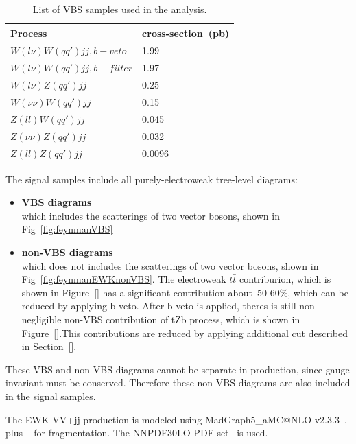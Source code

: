 \begin{table}[!htbp]
\begin{center}
\small
\begin{tabular}{|l|l|}
\hline
Process & cross-section~(pb) \\
\hline
$W(l\nu)W(qq\prime)jj,b-veto$     & 1.99    \\
$W(l\nu)W(qq\prime)jj,b-filter$   &  1.97   \\
$W(l\nu)Z(qq\prime)jj$            &  0.25   \\
$W(\nu\nu)W(qq\prime)jj$          &  0.15   \\
$Z(ll)W(qq\prime)jj$              &  0.045  \\
$Z(\nu\nu)Z(qq\prime)jj$          &  0.032  \\
$Z(ll)Z(qq\prime)jj$              &  0.0096 \\
\hline
\end{tabular}
\caption{List of VBS samples used in the analysis.
}
\label{tab:VBS_sig_samples}
\end{center}
\end{table}

The signal samples include all purely-electroweak tree-level diagrams:
\begin{itemize}
    \item \textbf{VBS diagrams} 
    \\ which includes the scatterings of two vector bosons, shown in Fig~\ref{fig:feynmanVBS}
    \item \textbf{non-VBS diagrams} 
    \\ which does not includes the scatterings of two vector bosons, shown in Fig~\ref{fig:feynmanEWKnonVBS}. The electroweak $t\bar{t}$ contriburion, which is shown in Figure~\ref{} has a significant contribution about~50-60\%, which can be reduced by applying b-veto. After b-veto is applied, theres is still non-negligible non-VBS contribution of tZb process, which is shown in Figure~\ref{}.This contributions are reduced by applying additional cut described in Section~\ref{}.
\end{itemize}

These VBS and non-VBS diagrams cannot be separate in production, since gauge invariant must be conserved. Therefore these non-VBS diagrams are also included in the signal samples.

The EWK VV+jj production is modeled using MadGraph5\_aMC@NLO v2.3.3~\cite{Alwall:2014hca},
plus ~\cite{Sjostrand:2007gs} for fragmentation.
The \textsc{NNPDF30LO} PDF set~\cite{Ball:2012cx} is used.


